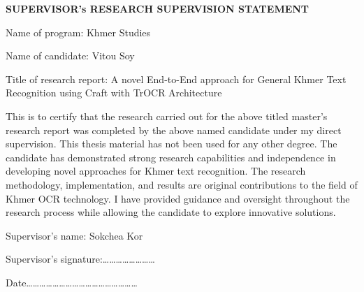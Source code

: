 \begin{adjustwidth}{0.2cm}{0.2cm}


    \begin{center}
        {\englishfont\fontsize{14pt}{21pt}\selectfont \textbf{SUPERVISOR's RESEARCH SUPERVISION STATEMENT} \par}
    \end{center}
    \label{supervisor-statement}

    \vspace{1cm}
    
    \englishfont\large
    \begin{flushleft}
    Name of program: Khmer Studies\par
    Name of candidate: Vitou Soy\par
    \end{flushleft}

    \vspace{1cm}
    
    \englishfont\large
    \begin{flushleft}
    Title of research report: A novel End-to-End approach for General Khmer Text
    Recognition using Craft with TrOCR Architecture\par
    \end{flushleft}

    \vspace{1cm}
    \setlength{\parindent}{0pt}
    This is to certify that the research carried out for the above titled master's
    research report was completed by the above named candidate under my direct
    supervision. This thesis material has not been used for any other degree. The
    candidate has demonstrated strong research capabilities and independence in
    developing novel approaches for Khmer text recognition. The research
    methodology, implementation, and results are original contributions to the field
    of Khmer OCR technology. I have provided guidance and oversight throughout
    the research process while allowing the candidate to explore innovative
    solutions.\par

    \vspace{1cm}
    \begin{flushleft}
    Supervisor's name: Sokchea Kor\par
    \vspace{0.1cm}
    Supervisor's signature:……………………\par
    \vspace{0.1cm}
    Date……………………………………………\par
    \end{flushleft}

\end{adjustwidth}